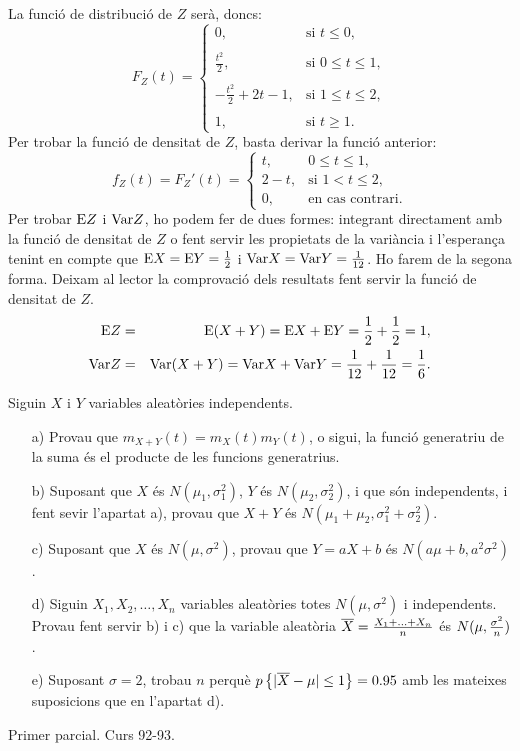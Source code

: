 {La funci\'o de distribuci\'o de $Z$ ser\`a, doncs:
$$F_Z (t)=
\left\{\begin{array}{ll}
0, & \text{si $t\leq 0$},\\ & \\
\frac{t^2}{2}, & \text{si $0\leq 
t\leq 1$}, \\ & \\
-\frac{t^2}{2}+2 t-1, & \text{si $1\leq t\leq 2$},\\ & \\ 1, & 
\text{si $t\geq 1$.}
\end{array}\right.
$$
Per trobar la funci\'o de densitat de $Z$, basta derivar la funci\'o anterior:
$$
f_Z(t)=F_Z'(t)=
\left\{\begin{array}{ll}
t, & \text{$0\leq t\leq 1$},\\
2-t, & \text{si $1<t\leq 2$}, \\ 
0, & \text{en cas contrari.}
\end{array}\right.
$$
Per trobar ${\rm E} Z$ i ${\rm Var} Z$, ho podem fer de dues formes: integrant 
directament amb la funci\'o de densitat de $Z$ o fent servir les 
propietats de la vari\`ancia i l'esperan\c{c}a tenint en compte que 
\mbox{${\rm E} X={\rm E} Y=\frac{1}{2}$} i \mbox{${\rm Var} X={\rm Var} Y=\frac{1}{12}$}. 
Ho farem de la segona forma. Deixam al lector la 
comprovaci\'o dels resultats fent servir la funci\'o de densitat de $Z$.
\begin{eqnarray*}
	{\rm E} Z & = & {\rm E} (X+Y)= {\rm E} X +{\rm E} Y =\frac{1}{2}+\frac{1}{2}=1, \\
	{\rm Var} Z & = & {\rm Var} (X+Y) ={\rm Var} X+{\rm Var} Y=
	\frac{1}{12}+\frac{1}{12}=\frac{1}{6}.
\end{eqnarray*}}


\begin{probres}
{Siguin $X$ i $Y$ variables aleat\`ories independents.
\begin{itemize}
\item[a)] {Provau que $m_{X+Y}(t)=m_X(t) m_Y(t)$, o sigui, la funci\'o
generatriu de la suma \'es el producte de les funcions generatrius.}
\item[b)] {Suposant que $X$ \'es $N(\mu_1,\sigma_1^2)$,
$Y$ \'es $N(\mu_2,\sigma_2^2)$, i que s\'on independents, i fent sevir l'apartat
a), provau que $X+Y$ \'es $N(\mu_1+\mu_2,\sigma_1^2 +\sigma_2^2)$.}
\item[c)] {Suposant que $X$ \'es $N(\mu,\sigma^2)$, provau que $Y=aX+b$ \'es
$N(a \mu +b, a^2\sigma^2)$.}
\item[d)] {Siguin $X_1,X_2,\ldots,X_n$ variables aleat\`ories totes 
$N(\mu,\sigma^2)$ i independents. Provau fent servir b) i c) que la variable
aleat\`oria $\overline{X}={X_1+\ldots +X_n\over n}$ \'es $N(\mu,{\sigma^2\over
n})$.}
\item[e)] {Suposant $\sigma =2$, trobau $n$ perqu\`e $p\left\{\vert
\overline{X}-\mu\vert\leq 1\right\}=0.95$ amb les mateixes suposicions que en
l'apartat d).}
\end{itemize}
{\footnotesize Primer parcial. Curs 92-93.}
} 
\end{probres}

